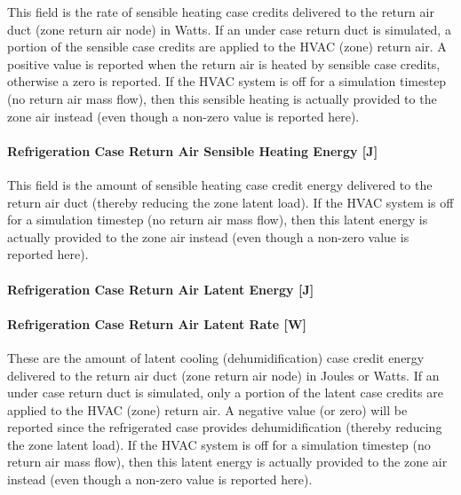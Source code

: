 This field is the rate of sensible heating case credits delivered to the return air duct (zone return air node) in Watts. If an under case return duct is simulated, a portion of the sensible case credits are applied to the HVAC (zone) return air. A positive value is reported when the return air is heated by sensible case credits, otherwise a zero is reported. If the HVAC system is off for a simulation timestep (no return air mass flow), then this sensible heating is actually provided to the zone air instead (even though a non-zero value is reported here).

\paragraph{Refrigeration Case Return Air Sensible Heating Energy {[}J{]}}\label{refrigeration-case-return-air-sensible-heating-energy-j}

This field is the amount of sensible heating case credit energy delivered to the return air duct (thereby reducing the zone latent load). If the HVAC system is off for a simulation timestep (no return air mass flow), then this latent energy is actually provided to the zone air instead (even though a non-zero value is reported here).

\paragraph{Refrigeration Case Return Air Latent Energy {[}J{]}}\label{refrigeration-case-return-air-latent-energy-j}

\paragraph{Refrigeration Case Return Air Latent Rate {[}W{]}}\label{refrigeration-case-return-air-latent-rate-w}

These are the amount of latent cooling (dehumidification) case credit energy delivered to the return air duct (zone return air node) in Joules or Watts. If an under case return duct is simulated, only a portion of the latent case credits are applied to the HVAC (zone) return air. A negative value (or zero) will be reported since the refrigerated case provides dehumidification (thereby reducing the zone latent load). If the HVAC system is off for a simulation timestep (no return air mass flow), then this latent energy is actually provided to the zone air instead (even though a non-zero value is reported here).

